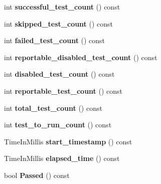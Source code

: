 \begin{DoxyCompactItemize}
int {\bfseries successful\+\_\+test\+\_\+count} () const
\item 
\mbox{\label{classtesting_1_1UnitTest_a0082c74809be04baf7e43842ddac4ae5}} 
int {\bfseries skipped\+\_\+test\+\_\+count} () const
\item 
\mbox{\label{classtesting_1_1UnitTest_ace1c860482b4ae5c341df5a9665e5c08}} 
int {\bfseries failed\+\_\+test\+\_\+count} () const
\item 
\mbox{\label{classtesting_1_1UnitTest_a2a2835db178d5c8569507db9f0a3d54f}} 
int {\bfseries reportable\+\_\+disabled\+\_\+test\+\_\+count} () const
\item 
\mbox{\label{classtesting_1_1UnitTest_ad69ccf3d4a9bc7333badeafbde3bc76b}} 
int {\bfseries disabled\+\_\+test\+\_\+count} () const
\item 
\mbox{\label{classtesting_1_1UnitTest_a449d0e0350ef146040cd37679c005248}} 
int {\bfseries reportable\+\_\+test\+\_\+count} () const
\item 
\mbox{\label{classtesting_1_1UnitTest_af6e02fcf76fd7247687f4e8af6e7ef41}} 
int {\bfseries total\+\_\+test\+\_\+count} () const
\item 
\mbox{\label{classtesting_1_1UnitTest_a461f46b2976f135d2a65e8d3def746e9}} 
int {\bfseries test\+\_\+to\+\_\+run\+\_\+count} () const
\item 
\mbox{\label{classtesting_1_1UnitTest_a3d83fe1cc5570a1c34f9754b0f56d65f}} 
Time\+In\+Millis {\bfseries start\+\_\+timestamp} () const
\item 
\mbox{\label{classtesting_1_1UnitTest_acf608411a17cb3b40a1e9d724f262b3b}} 
Time\+In\+Millis {\bfseries elapsed\+\_\+time} () const
\item 
\mbox{\label{classtesting_1_1UnitTest_a7c9b327bc14cb8a282c789dc6513a55b}} 
bool {\bfseries Passed} () const
\item 
\mbox{\label{classtesting_1_1UnitTest_a706f29e765916616b11a271a65948727}} 

\end{DoxyCompactItemize}
